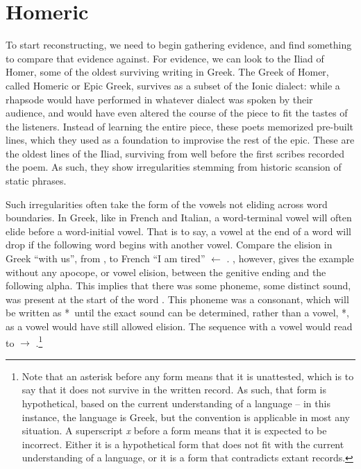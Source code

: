 \section{Homeric}\label{sec:Homeric}

To start reconstructing, we need to begin gathering evidence, and find something to compare that evidence against. For evidence, we can look to the Iliad of Homer, some of the oldest surviving writing in Greek. The Greek of Homer, called Homeric or Epic Greek, survives as a subset of the Ionic dialect: while a rhapsode would have performed in whatever dialect was spoken by their audience, and would have even altered the course of the piece to fit the tastes of the listeners. Instead of learning the entire piece, these poets memorized pre-built lines, which they used as a foundation to improvise the rest of the epic. These are the oldest lines of the Iliad, surviving from well before the first scribes recorded the poem. As such, they show irregularities stemming from historic scansion of static phrases.

Such irregularities often take the form of the vowels not eliding across word boundaries. In Greek, like in French and Italian, a word-terminal vowel will often elide before a word-initial vowel. That is to say, a vowel at the end of a word will drop if the following word begins with another vowel. Compare the elision in Greek   ``with us'', from , to French   ``I am tired'' $\gets$ . , however, gives the example  without any apocope, or vowel elision, between the genitive ending  and the following alpha.\autocite[XV.214]{Iliad_1999} This implies that there was some phoneme, some distinct sound, was present at the start of the word . This phoneme was a consonant, which will be written as *\w\ until the exact sound can be determined, rather than a vowel, *\vowel, as a vowel would have still allowed elision. The sequence with a vowel would read  to  $\to$ .\footnote{Note that an asterisk before any form means that it is unattested, which is to say that it does not survive in the written record. As such, that form is hypothetical, based on the current understanding of a language -- in this instance, the language is Greek, but the convention is applicable in most any situation. A superscript \textit{x} before a form means that it is expected to be incorrect. Either it is a hypothetical form that does not fit with the current understanding of a language, or it is a form that contradicts extant records.}

